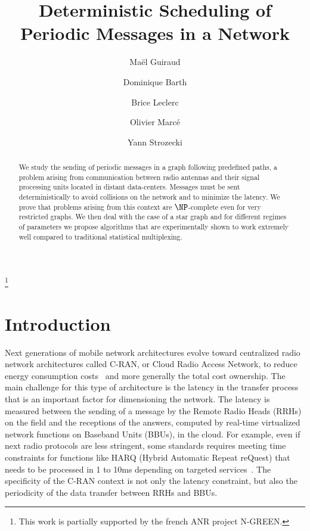 \documentclass[a4paper,10pt]{article}
\title{Deterministic Scheduling of Periodic Messages in a Network}%
\author[1]{Ma\"el Guiraud}
\author[1]{Dominique Barth}
\author[2]{Brice Leclerc}
\author[2]{Olivier Marc\'e}
\author[1]{Yann Strozecki}
\affil[1]{David Laboratory, UVSQ}
\affil[2]{Nokia Bell Labs France}
\begin{document}
\maketitle

\begin{abstract}
We study the sending of periodic messages in a graph following predefined paths, a problem arising from communication between radio antennas and their signal processing units located in distant data-centers. Messages must be sent deterministically to avoid collisions on the network and to minimize the latency. We prove that problems arising from this context are $\NP$-complete even for very restricted graphs. We then deal with the case of a star graph and for different regimes of parameters we propose algorithms that are experimentally shown to work extremely well compared to traditional statistical multiplexing.
\end{abstract}

\footnote{This work is partially supported by the french ANR project N-GREEN.}

\section{Introduction}

Next generations of mobile network architectures evolve toward centralized radio network architectures called C-RAN, or Cloud Radio Access Network, to reduce energy consumption costs~\cite{mobile2011c} and more generally the total cost ownership. The main challenge for this type of architecture is the latency in the transfer process that is an important factor for dimensioning the network. The latency is measured between the sending of a message by the Remote Radio Heads (RRHs) on the field and the receptions of the answers, computed by real-time virtualized network functions on Baseband Units (BBUs), in the cloud. For example, even if next radio protocols are less stringent, some standards requires meeting time constraints for functions like HARQ (Hybrid Automatic Repeat reQuest) that needs to be processed in 1 to 10ms depending on targeted services~\cite{bouguen2012lte}. The specificity of the C-RAN context is not only the latency constraint, but also the periodicity of the data transfer between RRHs and BBUs.
\end{document}
